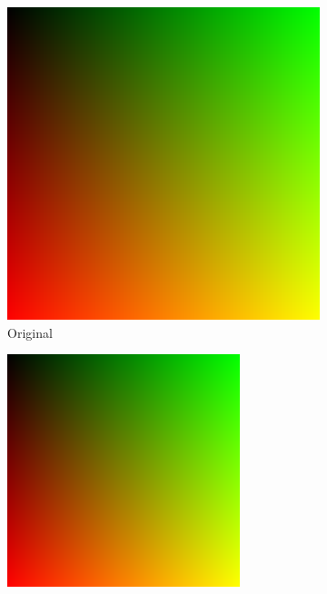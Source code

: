 \documentclass{article}
\begin{document}
\begin{figure}[ht]
  \centering
  \begin{subfigure}{0.23\textwidth}
    \centering
    \includegraphics[width=\textwidth]{gradiente/gradiente.png}
    \caption{Original}
  \end{subfigure}%
  \hfill
  \begin{subfigure}{0.23\textwidth}
    \centering
    \includegraphics[width=\textwidth]{gradiente/compressed.png}

\end{subfigure}
\end{figure}
\end{document}

